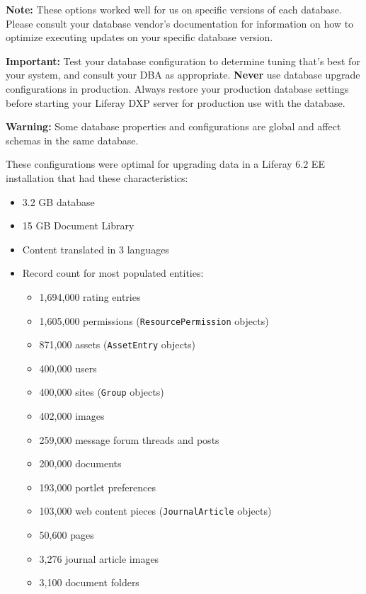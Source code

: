 \textbf{Note:} These options worked well for us on specific versions of
each database. Please consult your database vendor's documentation for
information on how to optimize executing updates on your specific
database version.

\noindent\hrulefill

\noindent\hrulefill

\textbf{Important:} Test your database configuration to determine tuning
that's best for your system, and consult your DBA as appropriate.
\textbf{Never} use database upgrade configurations in production. Always
restore your production database settings before starting your Liferay
DXP server for production use with the database.

\noindent\hrulefill

\noindent\hrulefill

\textbf{Warning:} Some database properties and configurations are global
and affect schemas in the same database.

\noindent\hrulefill

These configurations were optimal for upgrading data in a Liferay 6.2 EE
installation that had these characteristics:

\begin{itemize}
\item
  3.2 GB database
\item
  15 GB Document Library
\item
  Content translated in 3 languages
\item
  Record count for most populated entities:

  \begin{itemize}
  \tightlist
  \item
    1,694,000 rating entries
  \item
    1,605,000 permissions (\texttt{ResourcePermission} objects)
  \item
    871,000 assets (\texttt{AssetEntry} objects)
  \item
    400,000 users
  \item
    400,000 sites (\texttt{Group} objects)
  \item
    402,000 images
  \item
    259,000 message forum threads and posts
  \item
    200,000 documents
  \item
    193,000 portlet preferences
  \item
    103,000 web content pieces (\texttt{JournalArticle} objects)
  \item
    50,600 pages
  \item
    3,276 journal article images
  \item
    3,100 document folders
  \end{itemize}
\end{itemize}

